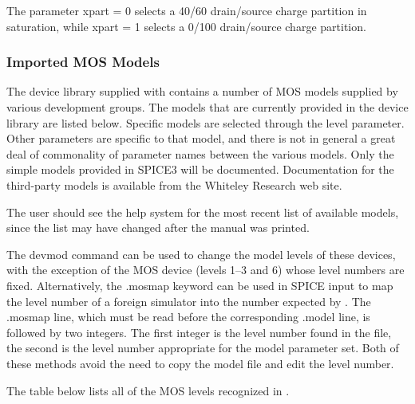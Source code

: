 The parameter {\vt xpart = 0} selects a 40/60 drain/source charge
partition in saturation, while {\vt xpart = 1} selects a 0/100
drain/source charge partition.

\subsubsection{Imported MOS Models}

The device library supplied with {\WRspice} contains a number of MOS
models supplied by various development groups.  The models that are
currently provided in the device library are listed below.  Specific
models are selected through the {\vt level} parameter.  Other
parameters are specific to that model, and there is not in general a
great deal of commonality of parameter names between the various
models.  Only the simple models provided in SPICE3 will be
documented.  Documentation for the third-party models is available
from the Whiteley Research web site.

The user should see the help system for the most recent list of
available models, since the list may have changed after the manual was
printed.

The {\cb devmod} command can be used to change the model levels of
these devices, with the exception of the MOS device (levels 1--3 and
6) whose level numbers are fixed.  Alternatively, the {\vt .mosmap}
keyword can be used in SPICE input to map the level number of a
foreign simulator into the number expected by {\WRspice}.  The {\vt
.mosmap} line, which must be read before the corresponding {\vt
.model} line, is followed by two integers.  The first integer is the
level number found in the file, the second is the {\WRspice} level
number appropriate for the model parameter set.  Both of these methods
avoid the need to copy the model file and edit the level number. 

The table below lists all of the MOS levels recognized in {\WRspice}.

